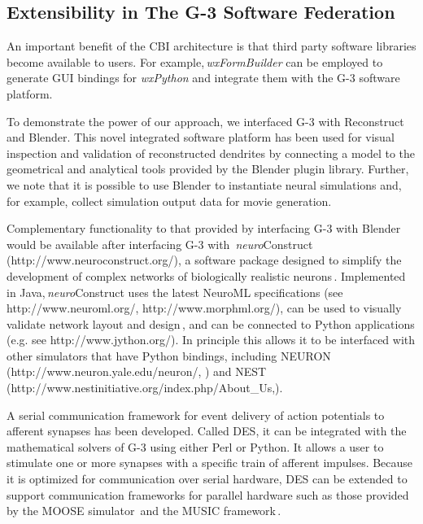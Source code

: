 \documentclass[10pt]{article}
\begin{document}
\subsection*{Extensibility in The G-3 Software Federation}

An important benefit of the CBI architecture is
that third party software libraries become available to users.  For
example,\,{\it wxFormBuilder} can be employed to generate GUI bindings for
{\it wxPython} and integrate them with the G-3 software platform.

To demonstrate the power of our approach, we
interfaced G-3 with Reconstruct and Blender. This novel integrated software
platform has been used for visual inspection and validation of
reconstructed dendrites by connecting a model to the geometrical and
analytical tools provided by the Blender plugin library.  Further, we
note that it is possible to use Blender to instantiate neural
simulations and, for example, collect simulation output data for
movie generation.  

Complementary functionality to that provided by interfacing G-3 with
Blender would be available after interfacing G-3 with\,{\it
  neuro}Construct (http://www.neuroconstruct.org/), a software package
designed to simplify the development of complex networks of
biologically realistic neurons\,\cite{gleeson10:neuroml,
  gleeson07}.  Implemented in Java,\,{\it neuro}Construct uses the
latest NeuroML specifications (see http://www.neuroml.org/,
http://www.morphml.org/), can be used to visually validate network
layout and design\,\cite{crook07:_morph}, and can be connected to
Python applications (e.g.  see http://www.jython.org/).  In principle
this allows it to be interfaced with other simulators that have Python
bindings, including NEURON  (http://www.neuron.yale.edu/neuron/, \cite{m93:_neural_system}) and NEST (http://www.nest\-initiative.org/index.php/About\_Us,\cite{diesmann01}).

A serial communication framework for event delivery of action
potentials to afferent synapses has been developed.  Called
DES, it can be integrated
with the mathematical solvers of G-3 using either Perl or Python. It allows a user to stimulate one or more synapses with a specific train of afferent impulses.
Because it is optimized for communication over serial hardware, DES
can be extended to support communication frameworks for parallel
hardware such as those provided by the MOOSE
simulator\,\cite{ray08:_pymoos} and the MUSIC
framework\,\cite{djurfeldt10:_run_time_inter_between_neuron}.
\end{document}
